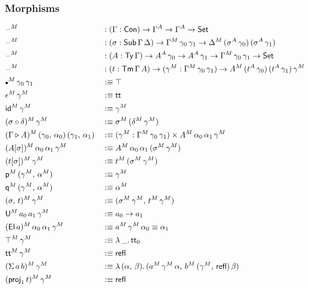 \documentclass[12pt,a4paper,twoside,openany]{book}
\theoremstyle{remark}
\theoremstyle{definition}
\theoremstyle{theorem}
\newcommand{\refl}{\mathsf{refl}}
\newcommand{\id}{\mathsf{id}}
\newcommand{\Con}{\mathsf{Con}}
\newcommand{\Sub}{\mathsf{Sub}}
\newcommand{\Tm}{\mathsf{Tm}}
\newcommand{\Ty}{\mathsf{Ty}}
\newcommand{\U}{\mathsf{U}}
\newcommand{\El}{\mathsf{El}}
\newcommand{\proj}{\mathsf{proj}}
\renewcommand{\tt}{\mathsf{tt}}
\newcommand{\blank}{\mathord{\hspace{1pt}\text{--}\hspace{1pt}}}
\newcommand{\Set}{\mathsf{Set}}
\newcommand{\ext}{\triangleright}
\newcommand{\emptycon}{\scaleobj{.75}\bullet}
\newcommand{\p}{\mathsf{p}}
\newcommand{\q}{\mathsf{q}}
\newcommand{\defn}{:\equiv}
\begin{document}
\subsubsection{Morphisms}
\vspace{-0.5em}
\begin{alignat*}{3}
  &\blank^M &&: (\Gamma : \Con) \to \Gamma^A \to \Gamma^A \to \Set\\
  &\blank^M &&: (\sigma : \Sub\,\Gamma\,\Delta) \to \Gamma^M\,\gamma_0\,\gamma_1 \to \Delta^M\,(\sigma^A\,\gamma_0)\,(\sigma^A\,\gamma_1)\\
  &\blank^M &&: (A : \Ty\,\Gamma) \to A^A\,\gamma_0 \to A^A\,\gamma_1 \to \Gamma^M\,\gamma_0\,\gamma_1 \to \Set\\
  &\blank^M &&: (t : \Tm\,\Gamma\,A) \to (\gamma^M : \Gamma^M\,\gamma_0\,\gamma_1) \to A^M\,(t^A\,\gamma_0)\,(t^A\,\gamma_1)\,\gamma^M\\
  &\emptycon^M\,\gamma_0\,\gamma_1 &&\defn \top \\
  &\epsilon^M\,\gamma^M &&\defn \tt\\
  &\id^M\,\gamma^M &&\defn \gamma^M\\
  &(\sigma \circ \delta)^M\,\gamma^M &&\defn \sigma^M\,(\delta^M\,\gamma^M)\\
  &(\Gamma \ext A)^M\,(\gamma_0,\,\alpha_0)\,(\gamma_1,\,\alpha_1) &&\defn
    (\gamma^M : \Gamma^M\,\gamma_0\,\gamma_1) \times A^M\,\alpha_0\,\alpha_1\,\gamma^M\\
  &(A[\sigma])^M\,\alpha_0\,\alpha_1\,\gamma^M &&\defn A^M\,\alpha_0\,\alpha_1\,(\sigma^M\,\gamma^M)\\
  &(t[\sigma])^M\,\gamma^M &&\defn t^M\,(\sigma^M\,\gamma^M)\\
  &\p^M\,(\gamma^M,\,\alpha^M) &&\defn \gamma^M\\
  &\q^M\,(\gamma^M,\,\alpha^M) &&\defn \alpha^M\\
  &(\sigma,\,t)^M\,\gamma^M &&\defn (\sigma^M\,\gamma^M,\,t^M\,\gamma^M)\\
  &\U^M\,a_0\,a_1\,\gamma^M &&\defn a_0 \to a_1\\
  &(\El\,a)^M\,\alpha_0\,\alpha_1\,\gamma^M &&\defn a^M\,\gamma^M\,\alpha_0 \equiv \alpha_1 \\
  &\top^M\,\gamma^M &&\defn \lambda\,\_.\,\tt_0\\
  &\tt^M\,\gamma^M &&\defn \refl\\
  &(\Sigma\,a\,b)^M\,\gamma^M &&\defn \lambda\,(\alpha,\,\beta).\,(a^M\,\gamma^M\,\alpha,\,b^M\,(\gamma^M,\,\refl)\,\beta)\\
  &(\proj_1\,t)^M\,\gamma^M &&\defn \refl\\

\end{alignat*}
\end{document}
